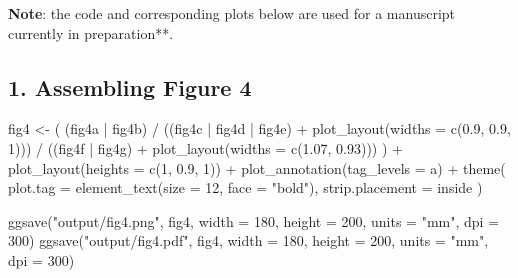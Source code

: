 \documentclass[
  letterpaper,
  DIV=11,
  numbers=noendperiod]{scrartcl}
\newenvironment{Shaded}{\begin{snugshade}}{\end{snugshade}}
\newcommand{\AttributeTok}[1]{\textcolor[rgb]{0.40,0.45,0.13}{#1}}
\newcommand{\DecValTok}[1]{\textcolor[rgb]{0.68,0.00,0.00}{#1}}
\newcommand{\FloatTok}[1]{\textcolor[rgb]{0.68,0.00,0.00}{#1}}
\newcommand{\FunctionTok}[1]{\textcolor[rgb]{0.28,0.35,0.67}{#1}}
\newcommand{\NormalTok}[1]{\textcolor[rgb]{0.00,0.23,0.31}{#1}}
\newcommand{\OtherTok}[1]{\textcolor[rgb]{0.00,0.23,0.31}{#1}}
\newcommand{\SpecialCharTok}[1]{\textcolor[rgb]{0.37,0.37,0.37}{#1}}
\newcommand{\StringTok}[1]{\textcolor[rgb]{0.13,0.47,0.30}{#1}}
\begin{document}
\textbf{Note}: the code and corresponding plots below are used for a
manuscript currently in preparation**.

\subsection{1. Assembling Figure 4}\label{assembling-figure-4}

\begin{Shaded}
\begin{Highlighting}[]
\NormalTok{fig4 }\OtherTok{\textless{}{-}}\NormalTok{ (}
\NormalTok{  (fig4a }\SpecialCharTok{|}\NormalTok{ fig4b) }\SpecialCharTok{/}
\NormalTok{  ((fig4c }\SpecialCharTok{|}\NormalTok{ fig4d }\SpecialCharTok{|}\NormalTok{ fig4e) }\SpecialCharTok{+} \FunctionTok{plot\_layout}\NormalTok{(}\AttributeTok{widths =} \FunctionTok{c}\NormalTok{(}\FloatTok{0.9}\NormalTok{, }\FloatTok{0.9}\NormalTok{, }\DecValTok{1}\NormalTok{))) }\SpecialCharTok{/}
\NormalTok{  ((fig4f }\SpecialCharTok{|}\NormalTok{ fig4g) }\SpecialCharTok{+} \FunctionTok{plot\_layout}\NormalTok{(}\AttributeTok{widths =} \FunctionTok{c}\NormalTok{(}\FloatTok{1.07}\NormalTok{, }\FloatTok{0.93}\NormalTok{)))}
\NormalTok{) }\SpecialCharTok{+}
  \FunctionTok{plot\_layout}\NormalTok{(}\AttributeTok{heights =} \FunctionTok{c}\NormalTok{(}\DecValTok{1}\NormalTok{, }\FloatTok{0.9}\NormalTok{, }\DecValTok{1}\NormalTok{)) }\SpecialCharTok{+}
  \FunctionTok{plot\_annotation}\NormalTok{(}\AttributeTok{tag\_levels =} \StringTok{\textquotesingle{}a\textquotesingle{}}\NormalTok{) }\SpecialCharTok{+}
  \FunctionTok{theme}\NormalTok{(}
    \AttributeTok{plot.tag =} \FunctionTok{element\_text}\NormalTok{(}\AttributeTok{size =} \DecValTok{12}\NormalTok{, }\AttributeTok{face =} \StringTok{"bold"}\NormalTok{),}
    \AttributeTok{strip.placement =} \StringTok{\textquotesingle{}inside\textquotesingle{}}
\NormalTok{  )}

\FunctionTok{ggsave}\NormalTok{(}\StringTok{"output/fig4.png"}\NormalTok{, fig4, }\AttributeTok{width =} \DecValTok{180}\NormalTok{, }\AttributeTok{height =} \DecValTok{200}\NormalTok{, }\AttributeTok{units =} \StringTok{"mm"}\NormalTok{, }\AttributeTok{dpi =} \DecValTok{300}\NormalTok{)}
\FunctionTok{ggsave}\NormalTok{(}\StringTok{"output/fig4.pdf"}\NormalTok{, fig4, }\AttributeTok{width =} \DecValTok{180}\NormalTok{, }\AttributeTok{height =} \DecValTok{200}\NormalTok{, }\AttributeTok{units =} \StringTok{"mm"}\NormalTok{, }\AttributeTok{dpi =} \DecValTok{300}\NormalTok{)}
\end{Highlighting}
\end{Shaded}
\end{document}
